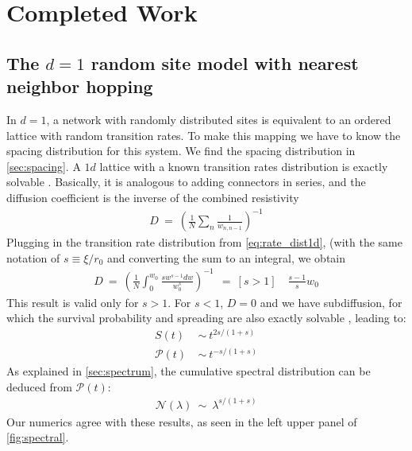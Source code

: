 \chapter{Completed Work}



\section{The $d=1$ random site model with nearest neighbor hopping}

In $d=1$, a network with randomly distributed sites is equivalent to
an ordered lattice with random transition rates. To make this mapping
we have to know the spacing distribution for this system. We find the
spacing distribution in \ref{sec:spacing}. A $1d$ lattice with
a known transition rates distribution is exactly solvable \cite{alexander}.
Basically, it is analogous to adding connectors in series, and 
the diffusion coefficient is the inverse of the combined resistivity
%
\begin{align}
D \ =\ \left(\frac{1}{N} \sum_n \frac{1}{w_{n,n-1}}\right)^{-1}
\end{align}
%
Plugging in the transition rate distribution from \ref{eq:rate_dist1d},
(with the same notation of $s \equiv \xi/r_0$ and converting the sum to an integral, we obtain
%
\begin{align}
D \ =\ \left(\frac{1}{N} \int_0^{w_0} \frac{s w^{s-1}dw}{w_0^s}\right)^{-1} \
\ =\ [s>1]\quad \frac{s-1}{s}w_0
\end{align}
This result is valid only for $s>1$. For $s<1$, $D=0$ and we have
subdiffusion, for which the survival probability and spreading 
are also exactly solvable \cite{alexander}, leading to:
%
\begin{align}
S(t)           \ &\sim \ t^{2s/(1+s)} \\
\mathcal{P}(t) \ &\sim \ t^{-s/(1+s)}
\end{align}
%
As explained in \ref{sec:spectrum}, the cumulative spectral distribution
can be deduced from $\mathcal{P}(t)$:
%
\begin{align}
\mathcal{N}(\lambda) \ \sim\ \lambda^{s/(1+s)}
\end{align}
%
Our numerics agree with these results, as seen in the left upper
panel of \ref{fig:spectral}.



